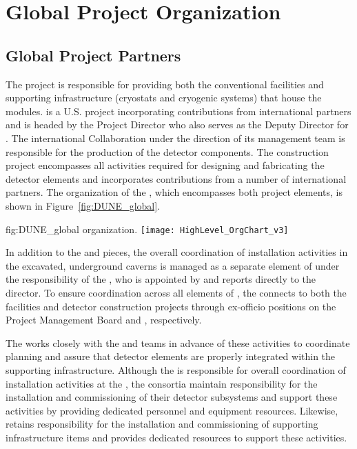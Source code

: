 \chapter{Global Project Organization}
\label{vl:tc-global}

\section{Global Project Partners}
\label{sec:partners}

The  project is responsible for providing both the 
conventional facilities and supporting infrastructure (cryostats 
and cryogenic systems) that house the   
modules.  is a U.S.  project incorporating 
contributions from international partners and is headed by the 
 Project Director who also serves as the  
Deputy Director for .  The international  
Collaboration under the direction of its management team is 
responsible for the production of the detector components.  The 
  construction project encompasses all 
activities required for designing and fabricating the 
detector elements and incorporates contributions from a number 
of international partners.  The 
organization of the , which encompasses 
both project elements, is shown in Figure~\ref{fig:DUNE_global}.
\begin{dunefigure}{fig:DUNE_global}
  { organization.}
  \texttt{[image: HighLevel\_OrgChart\_v3]}
\end{dunefigure}

In addition to the  and  pieces, the overall
coordination of installation activities in the excavated, underground
caverns is managed as a separate element of  under
the responsibility of the , who is appointed by and reports
directly to the  director.  To ensure coordination across
all elements of , the  connects to both
the facilities and detector construction projects through ex-officio
positions on the  Project Management Board and
 , respectively. 

The  works closely with the  and 
teams in advance of these activities to coordinate planning
and assure that detector elements are properly integrated within the 
supporting infrastructure.  Although the  is responsible 
for overall coordination of  installation activities
at the , the  consortia maintain responsibility 
for the installation and commissioning of their detector subsystems
and support these activities by providing dedicated personnel and
equipment resources.  Likewise,  retains responsibility
for the installation and commissioning of supporting infrastructure
items and provides dedicated resources to support these activities.          

